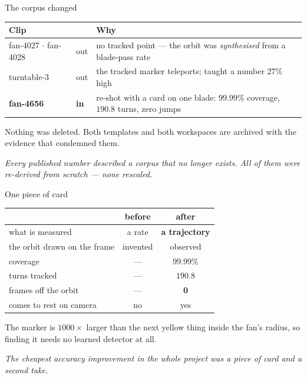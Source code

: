 \documentclass[aspectratio=169,10pt]{beamer}
\newcommand{\takeaway}[1]{\vfill{\footnotesize\itshape\color{cGrey}#1\par}}
\begin{document}
\begin{frame}{The corpus changed}
\vfill
\begin{center}
\small
\renewcommand{\arraystretch}{1.35}
\begin{tabular}{@{}llp{6.0cm}@{}}
\toprule
\rowcolor{cPed!12}
\textbf{Clip} & & \textbf{Why} \\
\midrule
fan-4027 $\cdot$ fan-4028 & {\color{cAccent}out} & no tracked point --- the orbit was
\emph{synthesised} from a blade-pass rate \\
turntable-3 & {\color{cAccent}out} & the tracked marker teleports; taught a number $27\%$ high \\
\midrule
\textbf{fan-4656} & {\color{cApp}\textbf{in}} & re-shot with a card on one blade:
$99.99\%$ coverage, $190.8$ turns, zero jumps \\
\bottomrule
\end{tabular}
\end{center}
\vfill
\begin{center}
{\footnotesize Nothing was deleted. Both templates and both workspaces are archived with the
evidence that condemned them.}
\end{center}
\takeaway{Every published number described a corpus that no longer exists. All of them were
re-derived from scratch --- none rescaled.}
\end{frame}

\begin{frame}{One piece of card}
\vfill
\begin{center}
\small
\renewcommand{\arraystretch}{1.4}
\begin{tabular}{@{}lcc@{}}
\toprule
\rowcolor{cPed!12}
& \textbf{before} & \textbf{after} \\
\midrule
what is measured & a rate & \textbf{a trajectory} \\
the orbit drawn on the frame & {\color{cAccent}invented} & {\color{cApp}observed} \\
coverage & --- & $99.99\%$ \\
turns tracked & --- & $190.8$ \\
frames off the orbit & --- & \textbf{0} \\
comes to rest on camera & no & {\color{cApp}yes} \\
\bottomrule
\end{tabular}
\end{center}
\vfill
\begin{center}
{\footnotesize The marker is $1000\times$ larger than the next yellow thing inside the fan's
radius, so finding it needs no learned detector at all.}
\end{center}
\takeaway{The cheapest accuracy improvement in the whole project was a piece of card and a
second take.}
\end{frame}
\end{document}
